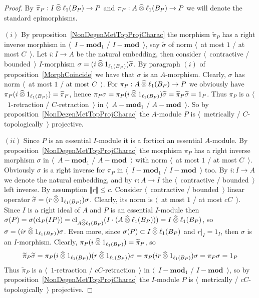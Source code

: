 \begin{proof} By $\widetilde{\pi}_P: I\mathbin{\widehat{\otimes}} \ell_1(B_P)\to P$ and
$\pi_P:A\mathbin{\widehat{\otimes}} \ell_1(B_P)\to P$ we will denote the standard epimorphisms.

$(i)$ By proposition~\ref{NonDegenMetTopProjCharac} the morphism
$\widetilde{\pi}_P$ has a right inverse morphism in $\langle$~$I-\mathbf{mod}_1$
/ $I-\mathbf{mod}$~$\rangle$, say $\widetilde{\sigma}$ of norm $\langle$~at most
$1$ / at most $C$~$\rangle$. Let $i:I\to A$ be the natural embedding, then
consider $\langle$~contractive / bounded~$\rangle$ $I$-morphism
$\sigma=(i\mathbin{\widehat{\otimes}} 1_{\ell_1(B_P)})\widetilde{\sigma}$. By paragraph $(i)$ of
proposition~\ref{MorphCoincide} we have that $\sigma$ is an $A$-morphism.
Clearly, $\sigma$ has norm $\langle$~at most $1$ / at most $C$~$\rangle$. For
$\pi_P:A\mathbin{\widehat{\otimes}} \ell_1(B_P)\to P$ we obviously 
have $\pi_P(i\mathbin{\widehat{\otimes}} 1_{\ell_1(B_P)})=\widetilde{\pi}_P$, 
hence 
$\pi_P\sigma
=\pi_P(i\mathbin{\widehat{\otimes}} 1_{\ell_1(B_P)})\widetilde{\sigma}
=\widetilde{\pi}_P\widetilde{\sigma}
=1_P$.
Thus $\pi_P$ is a $\langle$~$1$-retraction / $C$-retraction~$\rangle$ in
$\langle$~$A-\mathbf{mod}_1$ / $A-\mathbf{mod}$~$\rangle$. So by
proposition~\ref{NonDegenMetTopProjCharac} the $A$-module $P$ is
$\langle$~metrically / $C$-topologically~$\rangle$ projective.

$(ii)$ Since $P$ is an essential $I$-module it is a fortiori an essential
$A$-module. By proposition~\ref{NonDegenMetTopProjCharac} the morphism $\pi_P$
has a right inverse morphism $\sigma$ in $\langle$~$A-\mathbf{mod}_1$ /
$A-\mathbf{mod}$~$\rangle$ with norm $\langle$~at most $1$ / at most
$C$~$\rangle$. Obviously $\sigma$ is a right inverse for $\pi_P$ in
$\langle$~$I-\mathbf{mod}_1$ / $I-\mathbf{mod}$~$\rangle$ too. By $i:I\to A$ we
denote the natural embedding, and by $r:A\to I$ the $\langle$~contractive /
bounded~$\rangle$ left inverse. By assumption $\Vert r\Vert\leq c$. Consider
$\langle$~contractive / bounded~$\rangle$ linear operator
$\widetilde{\sigma}=(r\mathbin{\widehat{\otimes}} 1_{\ell_1(B_P)})\sigma$. Clearly, its norm is
$\langle$~at most $1$ / at most $cC$~$\rangle$. Since $I$ is a right ideal of
$A$ and $P$ is an essential $I$-module then
$\sigma(P)
=\sigma(\operatorname{cl}_P(IP))
=\operatorname{cl}_{A\mathbin{\widehat{\otimes}} \ell_1(B_P)}(I\cdot (A\mathbin{\widehat{\otimes}} \ell_1(B_P)))
=I\mathbin{\widehat{\otimes}} \ell_1(B_P)$, so
$\sigma=(ir\mathbin{\widehat{\otimes}} 1_{\ell_1(B_P)})\sigma$. Even more, 
since $\sigma(P)\subset I\mathbin{\widehat{\otimes}}\ell_1(B_P)$ and $r|_I=1_I$, 
then $\sigma$ is an $I$-morphism.
Clearly, $\pi_P(i\mathbin{\widehat{\otimes}} 1_{\ell_1(B_P)})=\widetilde{\pi}_P$, so
$$
\widetilde{\pi}_P\widetilde{\sigma}
=\pi_P(i\mathbin{\widehat{\otimes}} 1_{\ell_1(B_P)})(r \mathbin{\widehat{\otimes}} 1_{\ell_1(B_P)})\sigma
=\pi_P(ir\mathbin{\widehat{\otimes}} 1_{\ell_1(B_P)})\sigma
=\pi_P\sigma
=1_P
$$ 
Thus $\widetilde{\pi}_P$ is 
a $\langle$~$1$-retraction / $cC$-retraction~$\rangle$ 
in $\langle$~$I-\mathbf{mod}_1$ / $I-\mathbf{mod}$~$\rangle$, so by
proposition~\ref{NonDegenMetTopProjCharac} the $I$-module $P$ is
$\langle$~metrically / $cC$-topologically~$\rangle$ projective.
\end{proof}

